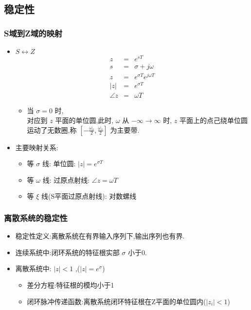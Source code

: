 \documentclass[table]{beamer}
\begin{document}
\subsection{稳定性}
\label{sec-5-1}
\begin{frame}
\frametitle{S域到Z域的映射}
\label{sec-5-1-1}
\begin{itemize}

\item $S\leftrightarrow Z$
\label{sec-5-1-1-1}%
\begin{eqnarray*}
z & = & e^{sT}\\
s &=& \sigma+j\omega \\
z &=& e^{\sigma T}e^{j\omega T} \\
|z| &=& e^{\sigma T} \\
\angle z &=& \omega T
\end{eqnarray*}
\begin{itemize}

\item 当  $\sigma=0$  时,\\
\label{sec-5-1-1-1-1}%
对应到  $z$  平面的单位圆,此时,  $\omega$  从  $-\infty\rightarrow\infty$ 时,  $z$  平面上的点己绕单位圆运动了无数圈,称  $[-\frac{\omega_s}{2},\frac{\omega_s}{2}]$  为主要带.

\end{itemize} %

\item 主要映射关系:
\label{sec-5-1-1-2}%
\begin{itemize}
\item 等  $\sigma$  线: 单位圆:   $|z|=e^{\sigma T}$
\item 等  $\omega$  线: 过原点射线:  $\angle z=\omega T$
\item 等  $\xi$  线(S平面过原点射线): 对数螺线
\end{itemize}

\end{itemize} %
\end{frame}
\begin{frame}
\frametitle{离散系统的稳定性}
\label{sec-5-1-2}

\begin{itemize}
\item 稳定性定义:离散系统在有界输入序列下,输出序列也有界.
\item <2->连续系统中:闭环系统的特征根实部 $\sigma$  小于0.
\item <3->离散系统中:  $|z|<1$ ,($|z|=e^{\sigma}$)
\begin{itemize}
\item 差分方程:特征根的模均小于1
\item 闭环脉冲传递函数:离散系统闭环特征根在Z平面的单位圆内($|z_i|<1$)
\end{itemize}
\end{itemize}
\end{frame}
\end{document}
